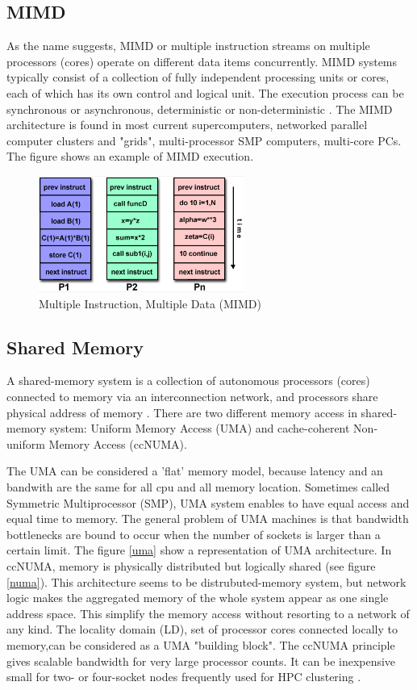 \subsection{MIMD} As the name suggests, MIMD or multiple instruction streams on multiple processors (cores) operate on different data items concurrently. MIMD systems typically consist of a collection of fully independent processing units or cores, each of which has its own control and logical unit. The execution process can be synchronous or asynchronous, deterministic or non-deterministic . The MIMD architecture is found in most current supercomputers, networked parallel computer clusters and "grids", multi-processor SMP computers, multi-core PCs. The figure  shows an example of MIMD execution.  
\begin{figure}[!h]
\centering 
\includegraphics[width=0.6\textwidth]{images/mimd.png}
\caption{Multiple Instruction, Multiple Data (MIMD)}
\label{sim1} 
\end{figure}

\subsection{Shared Memory} A shared-memory system is a collection of autonomous processors (cores) connected to memory via an interconnection network, and processors share physical address of memory \cite{Hager2010}. There are two different memory access in shared-memory system: Uniform Memory Access (UMA) and cache-coherent Non-uniform Memory Access (ccNUMA). 

The UMA can be considered a 'flat' memory model, because latency and an bandwith are the same for all cpu and all memory location. Sometimes called Symmetric Multiprocessor (SMP), UMA system  enables to have equal access and equal time to memory. The general problem of UMA machines is that bandwidth bottlenecks are bound to occur when the number of sockets is larger than a certain limit. The figure \ref{uma} show a representation of UMA architecture. 
In ccNUMA, memory is physically distributed but logically shared (see figure \ref{numa}). This architecture seems to be distrubuted-memory system, but network logic makes the aggregated memory of the whole system appear as
one single address space. This simplify the memory access without resorting to a network of any kind. The locality domain (LD), set of processor cores connected locally to memory,can be considered as a UMA "building block". The ccNUMA principle gives scalable bandwidth for very large processor counts. It can be inexpensive small for two- or four-socket nodes frequently used for HPC clustering \cite{Hager2010}.

